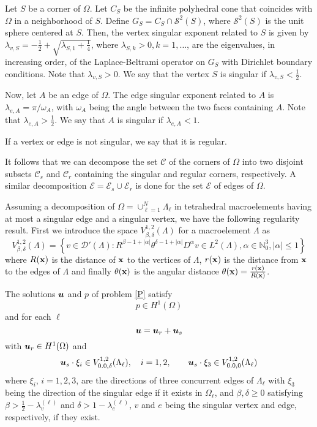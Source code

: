 Let $S$ be a corner of $\Omega$. Let $C_S$ be the infinite polyhedral
cone that coincides with $\Omega$ in a neighborhood of $S$. Define
$G_S=C_S\cap \mathcal S^2(S)$, where $\mathcal S^2(S)$ is the unit
sphere centered at $S$. Then, the vertex singular exponent related
to $S$ is given by
$\lambda_{v,S}=-\frac12+\sqrt{\lambda_{S,1}+\frac14}$, where
$\lambda_{S,k}>0, k=1,\ldots$, are the eigenvalues, in increasing
order, of the Laplace-Beltrami operator on $G_S$ with Dirichlet
boundary conditions. Note that $\lambda_{v,S}>0$. We say that the
vertex $S$ is singular if $\lambda_{v,S}<\frac12$.

Now, let $A$ be an edge of $\Omega$. The edge singular exponent
related to $A$ is $\lambda_{e,A}=\pi/\omega_{A}$, with
$\omega_{A}$ being the angle between the two faces containing $A$.
Note that $\lambda_{e,A}>\frac12$. We say that $A$ is singular
if $\lambda_{e,A}<1$.

If a vertex or edge is not singular, we say that it is regular.

It follows that we can decompose the set $\mathcal C$ of the
corners of $\Omega$ into two disjoint subsets $\mathcal C_s$ and
$\mathcal C_r$ containing the singular and regular corners,
respectively. A similar decomposition $\mathcal E=\mathcal
E_s\cup\mathcal E_r$ is done for the set $\mathcal E$ of edges of
$\Omega$.



Assuming a decomposition of $\Omega=\cup_{\ell=1}^N \Lambda_\ell$ in tetrahedral macroelements having at most a singular edge and a singular vertex, we have the following regularity result. First we introduce the space $V^{1,2}_{\beta,\delta}(\Lambda)$ for a macroelement $\Lambda$ as
\[
V^{1,2}_{\beta,\delta}(\Lambda) = \left\{v\in \mathcal D'(\Lambda): R^{\beta-1+|\alpha|}\theta^{\delta-1+|\alpha|}D^\alpha v\in L^2(\Lambda), \alpha\in \mathbb N_0^3, |\alpha|\le1\right\}
\]
where $R({\bf x})$ is the distance of ${\bf x}$ to the vertices of $\Lambda$, $r({\bf x})$ is the distance from ${\bf x}$ to the edges of $\Lambda$ and finally $\theta({\bf x})$ is the angular distance $\theta({\bf x})=\frac{r({\bf x})}{R({\bf x})}$.
\begin{theorem}
The solutions $\boldsymbol{u}$ and $p$ of problem \eqref{P} satisfy
\[
p\in H^1(\Omega)
\] 
and for each $\ell$
\[
\boldsymbol{u}=\boldsymbol{u}_r + \boldsymbol{u}_s
\]
with $\boldsymbol{u}_r\in H^1(\Omega)$ and
\[
\bu_s\cdot \xi_i\in V^{1,2}_{\beta,\delta}(\Lambda_\ell), \quad i=1,2, \qquad \bu_s\cdot\xi_3\in V^{1,2}_{\beta,0}(\Lambda_\ell)
\]
where $\xi_i$, $i=1,2,3$, are the directions of three concurrent edges of $\Lambda_\ell$ with $\xi_3$ being the direction of the singular edge if it exists in $\Omega_\ell$, and $\beta,\delta\ge0$ satisfying $\beta>\frac12-\lambda_v^{(\ell)}$ and $\delta>1-\lambda_e^{(\ell)}$, $v$ and $e$ being the singular vertex and edge, respectively, if they exist.
\end{theorem} 




